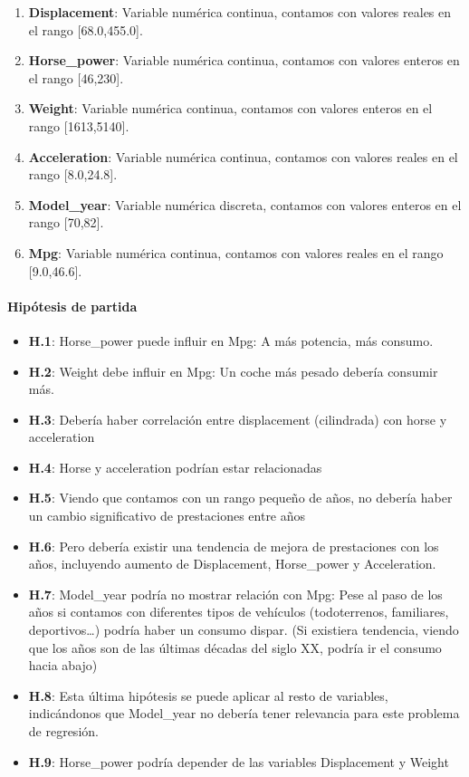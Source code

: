 \begin{enumerate}
    \def\labelenumi{\arabic{enumi}.}
    \item \textbf{Displacement}: Variable numérica continua, contamos con valores reales en el rango {[}68.0,455.0{]}.
    \item \textbf{Horse\_power}: Variable numérica continua, contamos con valores enteros en el rango {[}46,230{]}.
    \item \textbf{Weight}: Variable numérica continua, contamos con valores enteros en el rango {[}1613,5140{]}.
    \item \textbf{Acceleration}: Variable numérica continua, contamos con valores reales en el rango {[}8.0,24.8{]}.
    \item \textbf{Model\_year}: Variable numérica discreta, contamos con valores enteros en el rango {[}70,82{]}.
    \item \textbf{Mpg}: Variable numérica continua, contamos con valores reales en el rango {[}9.0,46.6{]}.
\end{enumerate}

\paragraph{Hipótesis de partida}

\begin{itemize}
    \item \textbf{H.1}: Horse\_power puede influir en Mpg: A más potencia, más consumo.
    \item \textbf{H.2}: Weight debe influir en Mpg: Un coche más pesado debería consumir más.
    \item \textbf{H.3}: Debería haber correlación entre displacement (cilindrada) con horse y acceleration
    \item \textbf{H.4}: Horse y acceleration podrían estar relacionadas
    \item \textbf{H.5}: Viendo que contamos con un rango pequeño de años, no debería haber un cambio significativo de prestaciones entre años
    \item \textbf{H.6}: Pero debería existir una tendencia de mejora de prestaciones con los años, incluyendo aumento de Displacement, Horse\_power y Acceleration.
    \item \textbf{H.7}: Model\_year podría no mostrar relación con Mpg: Pese al paso de los años si contamos con diferentes tipos de vehículos (todoterrenos, familiares, deportivos\ldots) podría haber un consumo dispar. (Si existiera tendencia, viendo que los años son de las últimas décadas del siglo XX, podría ir el consumo hacia abajo)
    \item \textbf{H.8}: Esta última hipótesis se puede aplicar al resto de variables, indicándonos que Model\_year no debería tener relevancia para este problema de regresión.
    \item \textbf{H.9}: Horse\_power podría depender de las variables Displacement y Weight
\end{itemize}

